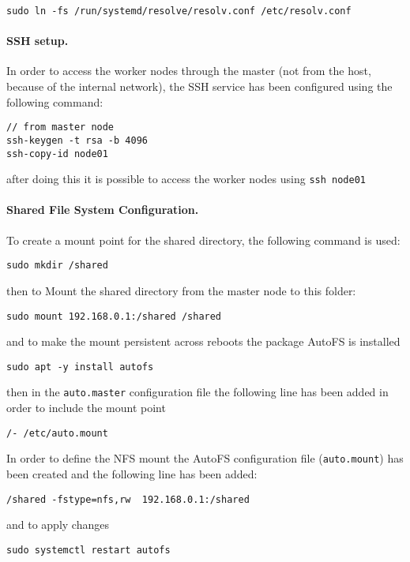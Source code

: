 \begin{verbatim}
sudo ln -fs /run/systemd/resolve/resolv.conf /etc/resolv.conf
\end{verbatim}

\paragraph{SSH setup.}
In order to access the worker nodes through the master (not from the host, because of the internal network), the SSH service has been configured using the following command:
\begin{verbatim}
// from master node
ssh-keygen -t rsa -b 4096
ssh-copy-id node01
\end{verbatim}

after doing this it is possible to access the worker nodes using \texttt{ssh node01}

\paragraph{Shared File System Configuration.}
To create a mount point for the shared directory, the following command is used:

\begin{verbatim}
sudo mkdir /shared
\end{verbatim}
then to Mount the shared directory from the master node to this folder:

\begin{verbatim}
sudo mount 192.168.0.1:/shared /shared
\end{verbatim}
and to make the mount persistent across reboots the package AutoFS is installed

\begin{verbatim}
sudo apt -y install autofs
\end{verbatim}

then in the \texttt{auto.master} configuration file the following line has been added in order to include the mount point

\begin{verbatim}
/- /etc/auto.mount
\end{verbatim}
In order to define the NFS mount the AutoFS configuration file (\texttt{auto.mount}) has been created and the following line has been added:
\begin{verbatim}
/shared -fstype=nfs,rw  192.168.0.1:/shared
\end{verbatim}
and to apply changes
\begin{verbatim}
sudo systemctl restart autofs
\end{verbatim}

